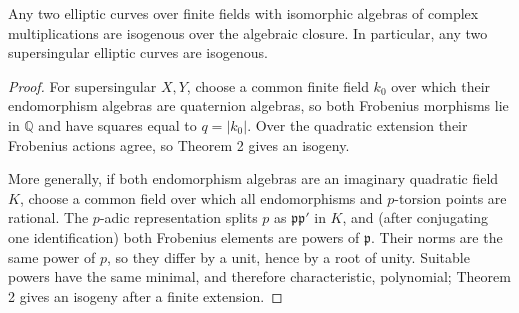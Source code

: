 \begin{corollary}
\label{mumford-cor-elliptic-cm-isogenous}
Any two elliptic curves over finite fields with isomorphic algebras of complex
multiplications are isogenous over the algebraic closure. In particular, any
two supersingular elliptic curves are isogenous.
\end{corollary}
\begin{proof}
For supersingular $X,Y$, choose a common finite field $k_0$ over which their
endomorphism algebras are quaternion algebras, so both Frobenius morphisms lie
in $\mathbb Q$ and have squares equal to $q=|k_0|$. Over the quadratic
extension their Frobenius actions agree, so Theorem 2 gives an isogeny.

More generally, if both endomorphism algebras are an imaginary quadratic field
$K$, choose a common field over which all endomorphisms and $p$-torsion points
are rational. The $p$-adic representation splits $p$ as
$\mathfrak p\mathfrak p'$ in $K$, and (after conjugating one identification)
both Frobenius elements are powers of $\mathfrak p$. Their norms are the same
power of $p$, so they differ by a unit, hence by a root of unity. Suitable
powers have the same minimal, and therefore characteristic, polynomial; Theorem
2 gives an isogeny after a finite extension.

\end{proof}
